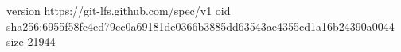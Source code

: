 version https://git-lfs.github.com/spec/v1
oid sha256:6955f58fc4ed79cc0a69181de0366b3885dd63543ae4355cd1a16b24390a0044
size 21944

